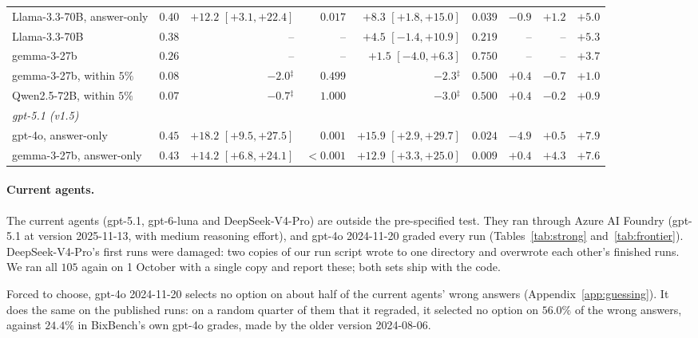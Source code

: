 \documentclass{article}
\begin{document}
\begin{table}[htbp]
{\begin{tabular}{lrrrrrrrr}
Llama-3.3-70B, answer-only & $0.40$ & $+12.2$ {\scriptsize$[+3.1,+22.4]$} & $0.017$ & $+8.3$ {\scriptsize$[+1.8,+15.0]$} & $0.039$ & $-0.9$ & $+1.2$ & $+5.0$\\
Llama-3.3-70B & $0.38$ & -- & -- & $+4.5$ {\scriptsize$[-1.4,+10.9]$} & $0.219$ & -- & -- & $+5.3$\\
gemma-3-27b & $0.26$ & -- & -- & $+1.5$ {\scriptsize$[-4.0,+6.3]$} & $0.750$ & -- & -- & $+3.7$\\
gemma-3-27b, within $5\%$ & $0.08$ & $-2.0$$^{\ddagger}$ & $0.499$ & $-2.3$$^{\ddagger}$ & $0.500$ & $+0.4$ & $-0.7$ & $+1.0$\\
Qwen2.5-72B, within $5\%$ & $0.07$ & $-0.7$$^{\ddagger}$ & $1.000$ & $-3.0$$^{\ddagger}$ & $0.500$ & $+0.4$ & $-0.2$ & $+0.9$\\
\multicolumn{9}{l}{\emph{gpt-5.1 (v1.5)}}\\
gpt-4o, answer-only & $0.45$ & $+18.2$ {\scriptsize$[+9.5,+27.5]$} & $0.001$ & $+15.9$ {\scriptsize$[+2.9,+29.7]$} & $0.024$ & $-4.9$ & $+0.5$ & $+7.9$\\
gemma-3-27b, answer-only & $0.43$ & $+14.2$ {\scriptsize$[+6.8,+24.1]$} & $<0.001$ & $+12.9$ {\scriptsize$[+3.3,+25.0]$} & $0.009$ & $+0.4$ & $+4.3$ & $+7.6$\\
\bottomrule
\end{tabular}}
\end{table}

\paragraph{Current agents.} The current agents (gpt-5.1, gpt-6-luna and DeepSeek-V4-Pro) are outside the
pre-specified test. They ran through Azure AI Foundry (gpt-5.1 at version 2025-11-13, with medium reasoning effort),
and gpt-4o 2024-11-20 graded every run (Tables~\ref{tab:strong} and~\ref{tab:frontier}). DeepSeek-V4-Pro's first runs
were damaged: two copies of our run script wrote to one directory and overwrote each other's finished runs. We ran
all $105$ again on 1 October with a single copy and report these; both sets ship with the code.

Forced to choose, gpt-4o 2024-11-20 selects no option on about half of the current agents' wrong answers
(Appendix~\ref{app:guessing}). It does the same on the published runs: on a random quarter of them that it regraded, it
selected no option on $56.0\%$ of the wrong answers, against $24.4\%$ in BixBench's own gpt-4o grades, made by the
older version 2024-08-06.
\end{document}
